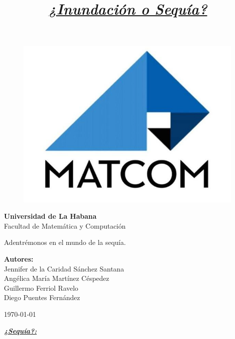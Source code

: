 \documentclass[12pt]{article}
\title{\textbf{\textit{\underline{¿Inundación o Sequía?}}}}
\begin{document}
	
\begin{titlepage}
	\centering
	\vspace*{1cm}
	\begin{figure}
		\centering
		\includegraphics[width=0.3\linewidth]{./Report/images/logo}
		\label{fig:logo}
	\end{figure}
	
	\large{\textbf{Universidad de La Habana}\\
	Facultad de Matemática y Computación\\}
	\vspace{3.5cm}
	
	{\rmfamily\selectfont\Huge{Adentrémonos en el mundo de la sequía.}} 
	\vspace{1.5cm}
	
	\Large
	\vspace{2 cm}
	\normalsize{\textbf{Autores:}\\
		Jennifer de la Caridad Sánchez Santana\\
		Angélica María Martínez Céspedez\\
		Guillermo Ferriol Ravelo\\
		Diego Puentes Fernández\\}
	\vfill
	
	\large
	\today
\end{titlepage}

	
	\begin{center}
		\textbf{\textit{\underline{{\fontsize{60}{24}\selectfont ¿Sequía?:}}}}
	\end{center}
	
\end{document}
